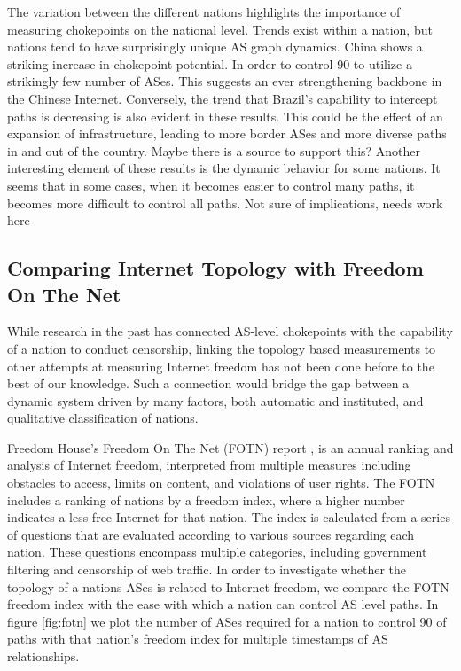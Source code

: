 \documentclass{article}
\begin{document}
\begin{multicols}{2}
\par 
The variation between the different nations highlights the importance of measuring
chokepoints on the national level. Trends exist within a nation, but nations
tend to have surprisingly unique AS graph dynamics. China shows a striking
increase in chokepoint potential. In order to control 90%
to utilize a strikingly few number of ASes. This suggests an ever
strengthening backbone in the Chinese Internet. Conversely, the trend that
Brazil's capability to intercept paths is decreasing is also evident in these
results. This could be the effect of an expansion of infrastructure, leading
to more border ASes and more diverse paths in and out of the country. {\color{blue}Maybe
there is a source to support this?} Another interesting element of these
results is the dynamic behavior for some nations. It seems that in some cases,
when it becomes easier to control many paths, it becomes more difficult to
control all paths. {\color{blue}Not sure of implications, needs work here}

\subsection{Comparing Internet Topology with Freedom On The Net}
While research in the past \cite{throats} has connected AS-level chokepoints with the capability of
a nation to conduct censorship, linking the topology based measurements to
other attempts at measuring Internet freedom has not been done before to the
best of our knowledge. Such a connection would bridge the gap between a
dynamic system driven by many factors, both automatic and instituted, and
qualitative classification of nations.
\par Freedom House's Freedom On The Net
(FOTN) report \cite{FOTN}, is an annual ranking and analysis of Internet
freedom, interpreted from multiple measures including obstacles to access,
limits on content, and violations of user rights. The FOTN includes a ranking
of nations by a freedom index, where a higher number indicates a less free
Internet for that nation. The index is calculated from a series of questions
that are evaluated according to various sources regarding each nation. These
questions encompass multiple categories, including government filtering and
censorship of web traffic. In order to investigate whether the topology of a
nations ASes is related to Internet freedom, we compare the FOTN freedom index
with the ease with which a nation can control AS level paths. In figure
\ref{fig:fotn} we plot the number of ASes required for a nation to control 90%
of paths with that nation's freedom index for multiple timestamps of AS
relationships.


\end{multicols}
\end{document}
